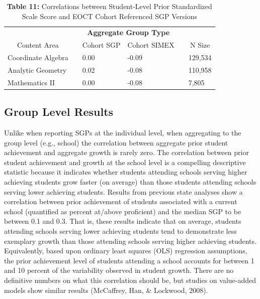 \documentclass[12pt]{article}
\begin{document}
\begin{table}[!htbp]
\caption*{\textbf{Table 11:} Correlations between Student-Level Prior Standardized Scale Score and EOCT Cohort Referenced SGP Versions\label{table11}} 
\begin{center}
\begin{tabular}{lcllcl}
\hline\hline
\multicolumn{1}{c}{\bfseries }&\multicolumn{1}{c}{\bfseries }&\multicolumn{2}{c}{\bfseries Aggregate Group Type}&\multicolumn{1}{c}{\bfseries }&\multicolumn{1}{c}{\bfseries }\tabularnewline
\cline{1-6}
\multicolumn{1}{c}{Content Area}&\multicolumn{1}{c}{}&\multicolumn{1}{c}{Cohort SGP}&\multicolumn{1}{c}{Cohort SIMEX}&\multicolumn{1}{c}{}&\multicolumn{1}{c}{N Size}\tabularnewline
\hline
Coordinate Algebra&&0.00&-0.09&&129,534\tabularnewline
Analytic Geometry &&0.02&-0.08&&110,958\tabularnewline
Mathematics II    &&0.00&-0.08&& 7,805\tabularnewline
\hline
\end{tabular}\end{center}

\end{table}

\subsection{Group Level Results}\label{group-level-results}

Unlike when reporting SGPs at the individual level, when aggregating to
the group level (e.g., school) the correlation between aggregate prior
student achievement and aggregate growth is rarely zero. The correlation
between prior student achievement and growth at the school level is a
compelling descriptive statistic because it indicates whether students
attending schools serving higher achieving students grow faster (on
average) than those students attending schools serving lower achieving
students. Results from previous state analyses show a correlation
between prior achievement of students associated with a current school
(quantified as percent at/above proficient) and the median SGP to be
between 0.1 and 0.3. That is, these results indicate that on average,
students attending schools serving lower achieving students tend to
demonstrate less exemplary growth than those attending schools serving
higher achieving students. Equivalently, based upon ordinary least
squares (OLS) regression assumptions, the prior achievement level of
students attending a school accounts for between 1 and 10 percent of the
variability observed in student growth. There are no definitive numbers
on what this correlation should be, but studies on value-added models
show similar results (McCaffrey, Han, \& Lockwood, 2008).
\end{document}
